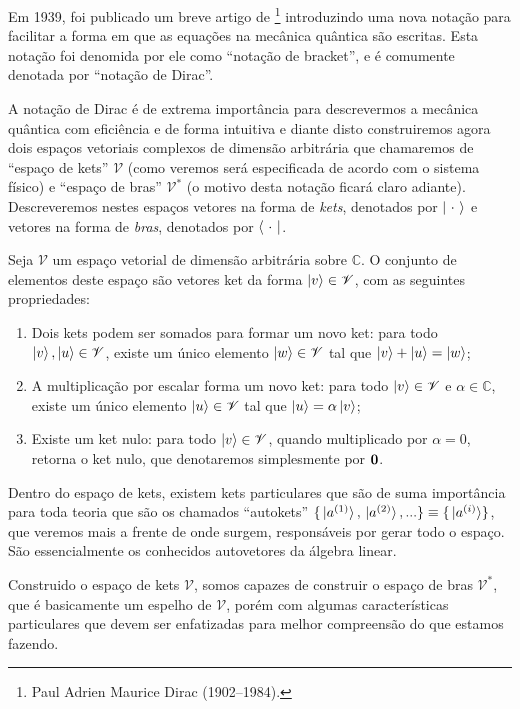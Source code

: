 Em 1939, foi publicado um breve artigo de \textcite{Dirac-notation}\footnote{Paul Adrien Maurice Dirac (1902--1984).} introduzindo uma nova notação para facilitar a forma em que as equações na mecânica quântica são escritas. Esta notação foi denomida por ele como “notação de bracket”, e é comumente denotada por “notação de Dirac”.

A notação de Dirac é de extrema importância para descrevermos a mecânica quântica com eficiência e de forma intuitiva e diante disto construiremos agora dois espaços vetoriais complexos de dimensão arbitrária que chamaremos de “espaço de kets” $\mathscr{V}$ (como veremos será especificada de acordo com o sistema físico) e “espaço de bras” $\mathscr{V}^{\ast}$ (o motivo desta notação ficará claro adiante). Descreveremos nestes espaços vetores na forma de \textit{kets}, denotados por $\ket{\ \cdot\ }$ e vetores na forma de \textit{bras}, denotados por $\bra{\ \cdot\ }$. 
\begin{definition}
    \label{def: ket space}
    Seja $\mathscr{V}$ um espaço vetorial de dimensão arbitrária sobre $\mathbb{C}$. O conjunto de elementos deste espaço são vetores ket da forma $\ket{v}\in\mathscr{V}$, com as seguintes propriedades:
    \begin{enumerate}
        \item Dois kets podem ser somados para formar um novo ket: para todo $\ket{v},\ket{u}\in\mathscr{V}$, existe um único elemento $\ket{w}\in\mathscr{V}$ tal que $\ket{v} + \ket{u} = \ket{w}$;
        \item A multiplicação por escalar forma um novo ket: para todo $\ket{v}\in\mathscr{V}$ e $\alpha\in\mathbb{C}$, existe um único elemento $\ket{u}\in\mathscr{V}$ tal que $\ket{u} = \alpha\ket{v}$;
        \item Existe um ket nulo: para todo $\ket{v}\in\mathscr{V}$, quando multiplicado por $\alpha = 0$, retorna o ket nulo, que denotaremos simplesmente por $\vb{0}$.
    \end{enumerate}
\end{definition}

Dentro do espaço de kets, existem kets particulares que são de suma importância para toda teoria que são os chamados “autokets” $\{\ket*{a^{(1)}}, \ket*{a^{(2)}},...\} \equiv \{\ket*{a^{(i)}}\}$, que veremos mais a frente de onde surgem, responsáveis por gerar todo o espaço. São essencialmente os conhecidos autovetores da álgebra linear.

Construido o espaço de kets $\mathscr{V}$, somos capazes de construir o espaço de bras $\mathscr{V}^{\ast}$, que é basicamente um espelho de $\mathscr{V}$, porém com algumas características particulares que devem ser enfatizadas para melhor compreensão do que estamos fazendo.

